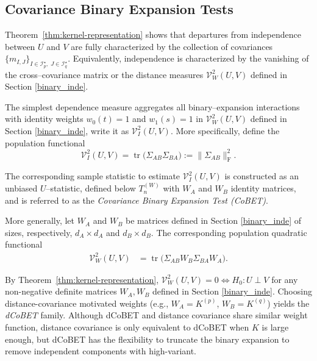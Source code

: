 \documentclass[12pt,reqno,oneside]{amsbook}
\theoremstyle{definition}
\theoremstyle{remark}
\begin{document}
\subsection{Covariance Binary Expansion Tests}
\label{subsec:cobet}


Theorem~\ref{thm:kernel-representation} shows that departures from independence
between $U$ and $V$ are fully characterized by the collection of covariances
$\{m_{I,J}\}_{I\in\mathcal I_p^\star,\;J\in\mathcal I_q^\star}$.
Equivalently, independence is characterized by the vanishing of the
cross--covariance matrix or the distance measures $\mathcal V_W^2(U,V)$
defined in Section \ref{binary_inde}.

The simplest dependence measure aggregates all 
binary--expansion interactions
with identity weights $w_0(t)=1$ and $w_1(s)=1$ in 
$\mathcal V_W^2(U,V)$ defined in Section \ref{binary_inde}, write it as
$\mathcal V_I^2(U,V)$. More specifically, 
define the population functional
\[
\mathcal V_I^2(U,V)
=
\operatorname{tr}\!\bigl(\Sigma_{AB}\Sigma_{BA}\bigr)
:=
\|\Sigma_{AB}\|_{\mathrm F}^2.
\]

The corresponding sample statistic to estimate $\mathcal V_I^2(U,V)$ 
is constructed as an unbiased $U$--statistic,
defined below $T_n^{(W)}$ with $W_A$ and $W_B$ identity matrices, 
and is referred to as the \emph{Covariance Binary Expansion Test (CoBET)}.


More generally, let $W_A$ and $W_B$ be
matrices defined in Section \ref{binary_inde} of sizes, respectively, $d_A\times d_A$ and
$d_B\times d_B$.
The corresponding population quadratic functional
\begin{equation*}
\begin{aligned}
\mathcal V_W^2(U,V)
&=
\operatorname{tr}\!\bigl(
\Sigma_{AB} W_B \Sigma_{BA} W_A
\bigr).
\end{aligned}
\end{equation*}

By Theorem~\ref{thm:kernel-representation}, $\mathcal V_W^2(U,V)=0\Longleftrightarrow H_0: U\perp V$  
for any non-negative definite matrices $W_A,W_B$ defined in Section \ref{binary_inde}. Choosing distance-covariance motivated weights (e.g., $W_A=K^{(p)}$, $W_B=K^{(q)}$)
yields the \emph{dCoBET} family. Although dCoBET and distance covariance share similar weight function, distance covariance is only equivalent to dCoBET when $K$ is large enough, but dCoBET has the flexibility to truncate the binary expansion to remove independent components with high-variant.
\end{document}
